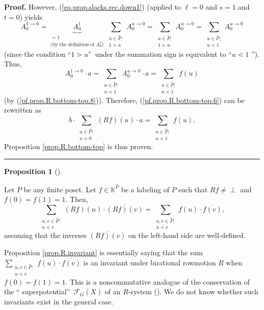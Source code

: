 \documentclass[numbers=enddot,12pt,final,onecolumn,notitlepage]{scrartcl}%
\theoremstyle{definition}
\newtheorem{prop}[theo]{Proposition}
\newenvironment{proposition}[1][]
{\begin{prop}[#1]\begin{leftbar}}
{\end{leftbar}\end{prop}}
\newenvironment{verlong}{}{}
\newcommand{\undf}{\operatorname*{\bot}}
\newcommand{\downslack}{A}
\newenvironment{proof}[1][Proof]{\noindent\textbf{#1.} }{\ \rule{0.5em}{0.5em}}
\let\sumnonlimits\sum
\renewcommand{\sum}{\sumnonlimits\limits}
\begin{document}
\begin{verlong}
\begin{proof}
However, (\ref{eq.prop.slacks.rec.down1}) (applied to $\ell=0$ and $s=1$ and
$t=0$) yields%
\[
\downslack_{0}^{1\rightarrow0}=\underbrace{\downslack_{0}^{1}}%
_{\substack{=1\\\text{(by the definition of }\downslack_{0}^{1}\text{)}}%
}\sum_{\substack{u\in\widehat{P};\\1\gtrdot u}}\downslack_{0}^{u\rightarrow
0}=\sum_{\substack{u\in\widehat{P};\\1\gtrdot u}}\downslack_{0}^{u\rightarrow
0}=\sum_{\substack{u\in\widehat{P};\\u\lessdot1}}\downslack_{0}^{u\rightarrow
0}%
\]
(since the condition \textquotedblleft$1\gtrdot u$\textquotedblright\ under
the summation sign is equivalent to \textquotedblleft$u\lessdot1$%
\textquotedblright). Thus,%
\[
\downslack_{0}^{1\rightarrow0}\cdot a=\sum_{\substack{u\in\widehat{P}%
;\\u\lessdot1}}\downslack_{0}^{u\rightarrow0}\cdot a=\sum_{\substack{u\in
\widehat{P};\\u\lessdot1}}f\left(  u\right)
\]
(by (\ref{pf.prop.R.bottom-top.8})). Therefore, (\ref{pf.prop.R.bottom-top.6})
can be rewritten as%
\[
b\cdot\sum_{\substack{u\in\widehat{P};\\u\gtrdot0}}\overline{\left(
Rf\right)  \left(  u\right)  }\cdot a=\sum_{\substack{u\in\widehat{P}%
;\\u\lessdot1}}f\left(  u\right)  .
\]
Proposition \ref{prop.R.bottom-top} is thus proven.
\end{proof}
\end{verlong}

\begin{proposition}
\label{prop.R.invariant}Let $P$ be any finite poset. Let $f\in\mathbb{K}%
^{\widehat{P}}$ be a labeling of $P$ such that $Rf\neq\undf$ and $f\left(
0\right)  =f\left(  1\right)  =1$. Then,%
\[
\sum_{\substack{u,v\in\widehat{P};\\u\lessdot v}}\left(  Rf\right)  \left(
u\right)  \cdot\overline{\left(  Rf\right)  \left(  v\right)  }=\sum
_{\substack{u,v\in\widehat{P};\\u\lessdot v}}f\left(  u\right)  \cdot
\overline{f\left(  v\right)  },
\]
assuming that the inverses $\overline{\left(  Rf\right)  \left(  v\right)  }$
on the left-hand side are well-defined.
\end{proposition}

Proposition \ref{prop.R.invariant} is essentially saying that the sum
$\sum_{\substack{u,v\in\widehat{P};\\u\lessdot v}}f\left(  u\right)
\cdot\overline{f\left(  v\right)  }$ is an invariant under birational
rowmotion $R$ when $f\left(  0\right)  =f\left(  1\right)  =1$. This is a
noncommutative analogue of the conservation of the \textquotedblleft
superpotential\textquotedblright\ $\mathcal{F}_{G}\left(  X\right)  $ of an
$R$-system (\cite[Proposition 5.2]{GalPyl19}). We do not know whether such
invariants exist in the general case.
\end{document}
